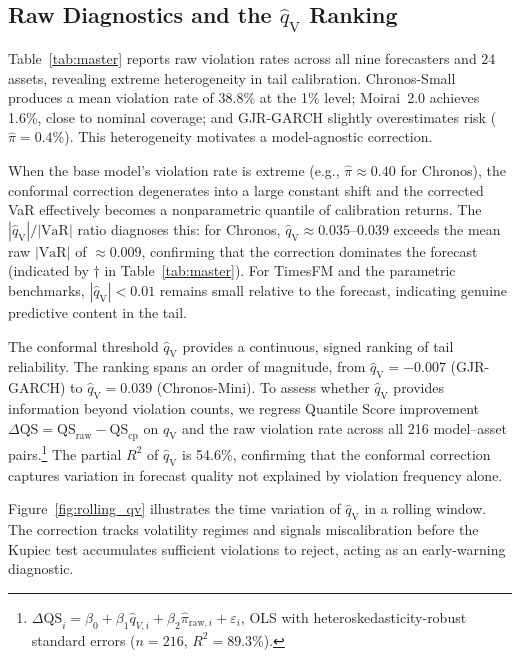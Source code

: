 \documentclass[preprint,11pt,authoryear]{elsarticle}
\newcommand{\VaR}{\mathrm{VaR}}
\newcommand{\1}{\boldsymbol{1}}
\newcommand{\qV}{\hat{q}_{\scriptscriptstyle\mathrm{V}}}
\begin{document}
	\subsection{Raw Diagnostics and the $\qV$ Ranking}
	\label{sec:results_raw}
	\label{sec:diagnostic}
	
	Table~\ref{tab:master} reports raw violation rates across all
	nine forecasters and 24 assets, revealing extreme heterogeneity
	in tail calibration. Chronos-Small produces a mean violation
	rate of 38.8\% at the 1\% level; Moirai~2.0 achieves 1.6\%,
	close to nominal coverage; and GJR-GARCH slightly overestimates
	risk ($\hat\pi = 0.4$\%). This heterogeneity motivates a
	model-agnostic correction.
	
	When the base model's violation rate is extreme (e.g.,
	$\hat\pi \approx 0.40$ for Chronos), the conformal correction
	degenerates into a large constant shift and the corrected VaR
	effectively becomes a nonparametric quantile of calibration
	returns. The $|\qV|/|\VaR|$ ratio diagnoses this: for
	Chronos, $\qV \approx 0.035$--$0.039$ exceeds the mean raw
	$|\VaR|$ of $\approx 0.009$, confirming that the correction
	dominates the forecast (indicated by $\dagger$ in
	Table~\ref{tab:master}). For TimesFM and the parametric
	benchmarks, $|\qV| < 0.01$ remains small relative to the
	forecast, indicating genuine predictive content in the tail.
	
	The conformal threshold $\qV$ provides a continuous, signed
	ranking of tail reliability. The ranking spans an order of
	magnitude, from $\qV = -0.007$ (GJR-GARCH) to $\qV = 0.039$
	(Chronos-Mini). To assess whether $\qV$ provides information
	beyond violation counts, we regress Quantile Score improvement
	$\Delta\mathrm{QS} = \mathrm{QS}_{\mathrm{raw}} -
	\mathrm{QS}_{\mathrm{cp}}$ on $\qV$ and the raw violation
	rate across all 216 model--asset
	pairs.\footnote{$\Delta\mathrm{QS}_i = \beta_0 + \beta_1
		\hat{q}_{V,i} + \beta_2 \hat\pi_{\mathrm{raw},i} +
		\varepsilon_i$, OLS with heteroskedasticity-robust standard
		errors ($n = 216$, $R^2 = 89.3$\%).} The partial $R^2$ of
	$\qV$ is 54.6\%, confirming that the conformal correction
	captures variation in forecast quality not explained by
	violation frequency alone.
	
	Figure~\ref{fig:rolling_qv} illustrates the time variation of
	$\qV$ in a rolling window. The correction tracks volatility
	regimes and signals miscalibration before the Kupiec test
	accumulates sufficient violations to reject, acting as an
	early-warning diagnostic.
	
\end{document}
